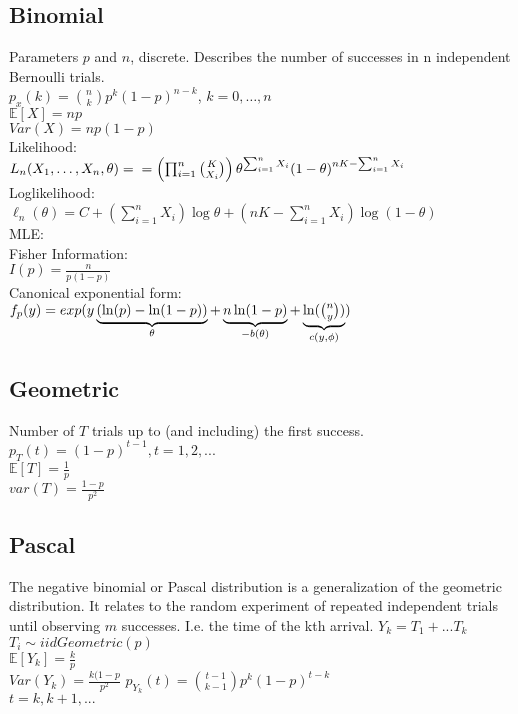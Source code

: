 \subsection*{Binomial}
Parameters $p$ and $n$, discrete. Describes the number of successes
in n independent Bernoulli trials.\\
$p_x(k)= {n\choose k}{p}^{k} \left( 1-p \right) ^{n-k}$, $k=0,\ldots, n$\\
$\mathbb{E}[X]=np$\\
$Var(X)= np(1-p)$ \\
Likelihood:\\
$\displaystyle  L_ n(X_1, \ldots , X_ n, \theta ) =\\
= \left( \prod _{i = 1}^ n \binom {K}{X_ i} \right) \theta ^{\sum _{i = 1}^ n X_ i} (1 - \theta )^{nK - \sum _{i = 1}^ n X_ i }$\\
Loglikelihood:\\
$\ell_n (\theta) = C + \left( \sum _{i = 1}^ n X_ i \right) \log \theta + \left( nK - \sum _{i = 1}^ n X_ i \right) \log (1 - \theta )$\\
MLE:\\
Fisher Information:\\
$I(p) = \frac{n}{p(1-p)}$\\
Canonical exponential form:\\
$f_ p(y) =\\  
exp (y \underbrace{(\ln (p)-\ln (1-p))}_{\theta } + \underbrace{n\ln (1-p)}_{-b(\theta )} +\underbrace{\ln(\binom {n}{y})}_{c(y,\phi )} )$
\subsection*{Geometric}
Number of $T$ trials up to (and including) the first success.
$p_T(t) = (1-p)^{t-1}, t=1,2,...$\\
$\mathbb{E}[T]=\frac{1}{p}$\\
$var(T)=\frac{1-p}{p^2}$ \\
\subsection*{Pascal}
The negative binomial or Pascal distribution is a generalization of the geometric distribution. It relates to the random experiment of repeated independent trials until observing $m$ successes. I.e. the time of the kth arrival.
$Y_k=T_1+...T_k$\\
$T_i \sim iid Geometric(p)$\\
$\mathbb{E}[Y_k]=\frac{k}{p}$\\
$Var(Y_k)= \frac{k(1-p}{p^2}$
$p_{Y_k}(t) ={t-1 \choose k-1}p^k(1-p)^{t-k}$\\
$t=k,k+1,...$
